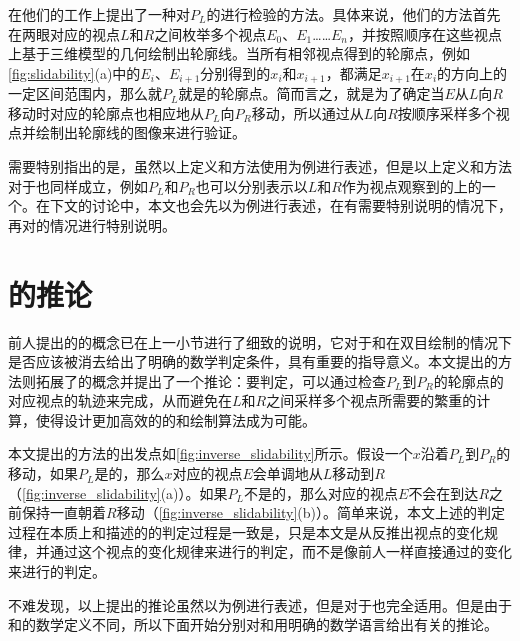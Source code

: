 \citeauthor{kim2013stereoscopic}在他们的工作上提出了一种对$P_L$的\epsl{}进行检验的方法。具体来说，他们的方法首先在两眼对应的视点$L$和$R$之间枚举多个视点$E_0$、$E_1$……$E_n$，并按照顺序在这些视点上基于三维模型的几何绘制出轮廓线。当所有相邻视点得到的轮廓点，例如\autoref{fig:slidability}(a)中的$E_i$、$E_{i+1}$分别得到的$x_i$和$x_{i+1}$，都满足$x_{i+1}$在$x_i$的\ec{}方向上的一定区间范围内，那么就$P_L$就是\epslb{}的轮廓点。简而言之，就是为了确定当$E$从$L$向$R$移动时对应的轮廓点也相应地从$P_L$向$P_R$移动，所以通过从$L$向$R$按顺序采样多个视点并绘制出轮廓线的图像来进行验证。

需要特别指出的是，虽然以上定义和方法使用\con{}为例进行表述，但是以上定义和方法对于\scon{}也同样成立，例如$P_L$和$P_R$也可以分别表示以$L$和$R$作为视点观察到的\scon{}上的一个\sconp{}。在下文的讨论中，本文也会先以\con{}为例进行表述，在有需要特别说明的情况下，再对\scon{}的情况进行特别说明。

\section{\epsl{}的推论}

前人提出的\epsl{}的概念已在上一小节进行了细致的说明，它对于\conp{}和\sconp{}在双目绘制的情况下是否应该被消去给出了明确的数学判定条件，具有重要的指导意义。本文提出的方法则拓展了\epsl{}的概念并提出了一个推论：要判定\epsl{}，可以通过检查$P_L$到$P_R$的轮廓点的对应视点的轨迹来完成，从而避免在$L$和$R$之间采样多个视点所需要的繁重的计算，使得设计更加高效的\stc{}的\con{}和\scon{}绘制算法成为可能。

本文提出的方法的出发点如\autoref{fig:inverse_slidability}所示。假设一个\conp{}$x$沿着$P_L$到$P_R$的\ec{}移动，如果$P_L$是\epslb{}的，那么$x$对应的视点$E$会单调地从$L$移动到$R$（\autoref{fig:inverse_slidability}(a)）。如果$P_L$不是\epslb{}的，那么对应的视点$E$不会在到达$R$之前保持一直朝着$R$移动（\autoref{fig:inverse_slidability}(b)）。简单来说，本文上述的判定过程在本质上和\citeauthor{kim2013stereoscopic}描述的\epsl{}的判定过程是一致是，只是本文是从\conp{}反推出视点的变化规律，并通过这个视点的变化规律来进行\epsl{}的判定，而不是像前人一样直接通过\conp{}的变化来进行\epsl{}的判定。

不难发现，以上提出的推论虽然以\con{}为例进行表述，但是对于\scon{}也完全适用。但是由于\con{}和\scon{}的数学定义不同，所以下面开始分别对\con{}和\scon{}用明确的数学语言给出有关\epsl{}的推论。

\subsection{\con{}}

